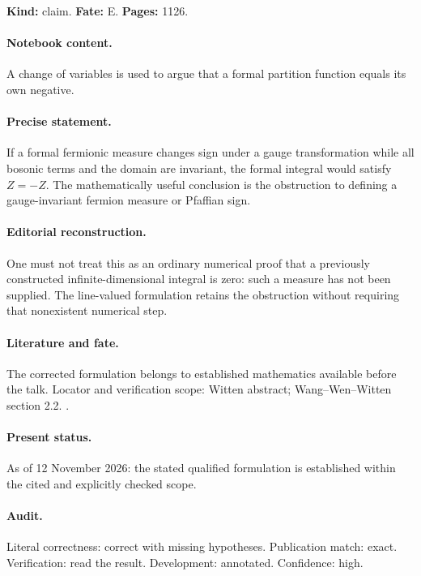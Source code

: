 \noindent\textbf{Kind:} claim. \textbf{Fate:} E. \textbf{Pages:} 1126.\par

\paragraph{Notebook content.} A change of variables is used to argue that a formal partition function equals its own negative.

\paragraph{Precise statement.} If a formal fermionic measure changes sign under a gauge transformation while all bosonic terms and the domain are invariant, the formal integral would satisfy \(Z=-Z\). The mathematically useful conclusion is the obstruction to defining a gauge-invariant fermion measure or Pfaffian sign.

\paragraph{Editorial reconstruction.} One must not treat this as an ordinary numerical proof that a previously constructed infinite-dimensional integral is zero: such a measure has not been supplied. The line-valued formulation retains the obstruction without requiring that nonexistent numerical step.

\paragraph{Literature and fate.} The corrected formulation belongs to established mathematics available before the talk. Locator and verification scope: Witten abstract; Wang--Wen--Witten section 2.2. \cite{witten1982anomaly,wangwenwitten2019new}.

\paragraph{Present status.} As of 12 November 2026: the stated qualified formulation is established within the cited and explicitly checked scope.

\paragraph{Audit.} Literal correctness: correct with missing hypotheses. Publication match: exact. Verification: read the result. Development: annotated. Confidence: high.

